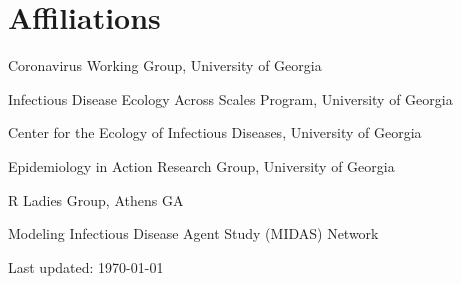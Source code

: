 \documentclass[letterpaper]{article}
\def\footerlink{}
\renewenvironment{itemize}{
  \begin{list}{}{
    \setlength{\leftmargin}{1.5em}
  }
}{
  \end{list}
}
\begin{document}
\section*{Affiliations}
\begin{itemize}
\item Coronavirus Working Group, University of Georgia
\item Infectious Disease Ecology Across Scales Program, University of Georgia  
\item Center for the Ecology of Infectious Diseases, University of Georgia 
\item Epidemiology in Action Research Group, University of Georgia 
\item R Ladies Group, Athens GA 
\item Modeling Infectious Disease Agent Study (MIDAS) Network

\end{itemize}

\bigskip

\begin{center}
  \begin{footnotesize}
    Last updated: \today \\
    \href{\footerlink}{\texttt{\footerlink}}
  \end{footnotesize}
\end{center}
\end{document}
